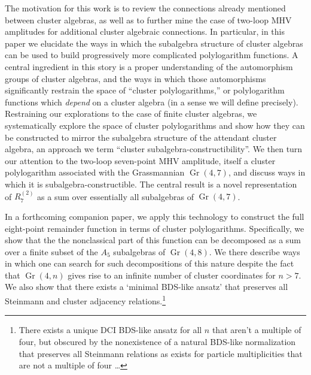 \documentclass[11pt]{article}
\DeclareMathOperator{\Gr}{Gr}
\begin{document}
The motivation for this work is to review the connections already mentioned between cluster algebras, as well as to further mine the case of two-loop MHV amplitudes for additional cluster algebraic connections. In particular, in this paper we elucidate the ways in which the subalgebra structure of cluster algebras can be used to build progressively more complicated polylogarithm functions. A central ingredient in this story is a proper understanding of the automorphism groups of cluster algebras, and the ways in which those automorphisms significantly restrain the space of ``cluster polylogarithms,'' or polylogarithm functions which \emph{depend} on a cluster algebra (in a sense we will define precisely). Restraining our explorations to the case of finite cluster algebras, we systematically explore the space of cluster polylogarithms and show how they can be constructed to mirror the subalgebra structure of the attendant cluster algebra, an approach we term ``cluster subalgebra-constructibility''.  We then turn our attention to the two-loop seven-point MHV amplitude, itself a cluster polylogarithm associated with the Grassmannian $\Gr(4,7)$, and discuss ways in which it is subalgebra-constructible. The central result is a novel representation of $R^{(2)}_7$ as a sum over essentially all subalgebras of $\Gr(4,7)$. 

In a forthcoming companion paper, we apply this technology to construct the full eight-point remainder function in terms of cluster polylogarithms. Specifically, we show that the the nonclassical part of this function can be decomposed as a sum over a finite subset of the $A_5$ subalgebras of $\Gr(4,8)$. We there describe ways in which one can search for such decompositions of this nature despite the fact that $\Gr(4,n)$ gives rise to an infinite number of cluster coordinates for $n>7$. We also show that there exists a `minimal BDS-like ansatz' that preserves all Steinmann and cluster adjacency relations.\footnote{There exists a unique DCI BDS-like ansatz for all $n$ that aren't a multiple of four, but  obscured by the nonexistence of a natural BDS-like normalization that preserves all Steinmann relations as exists for particle multiplicities that are not a multiple of four \dots}
\end{document}
